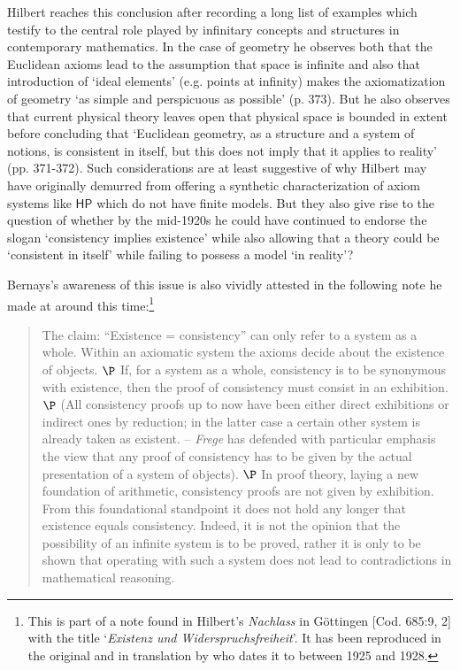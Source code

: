 \documentclass[11pt,fleqn,leqno]{article}
\begin{document}
Hilbert reaches this conclusion after recording a long list of examples which testify to the central role played by infinitary concepts and structures in contemporary mathematics.   In the case of geometry he observes both that the Euclidean axioms lead to the assumption that space is infinite and also that introduction of `ideal elements' (e.g. points at infinity) makes the axiomatization of geometry `as simple and perspicuous as possible' (p. 373).   But he also observes that current physical theory leaves open that physical space is bounded in extent before concluding that  `Euclidean geometry, as a structure and a system of notions, is consistent in itself, but this does not imply that it applies to reality' (pp. 371-372). Such considerations are at least suggestive of why Hilbert may have originally demurred from offering a synthetic characterization of axiom systems like $\mathsf{HP}$ which do not have finite models.    But they also give rise to the question of whether by the mid-1920s he could have continued to endorse the slogan `consistency implies existence' while also allowing that a theory could be `consistent in itself' while failing to possess a model `in reality'?

Bernays's awareness of this issue is also vividly attested in the following note he made at around this time:\footnote{This is part of a note found in Hilbert's \textsl{Nachlass} in G\"ottingen [Cod. 685:9, 2] with  the title `\textsl{Existenz und Widerspruchsfreiheit}'.   It has been reproduced in the original and in translation by \citet[p. 479]{Sieg2002a} who dates it to between 1925 and 1928.}
\begin{quote}
{\footnotesize  The claim: ``Existence = consistency'' can only refer to a system as a whole. Within an axiomatic system the axioms decide about the existence of objects. $\P$ If, for a system as a whole, consistency is to be synonymous with existence, then the proof of consistency must consist in an exhibition.  $\P$ (All consistency proofs up to now have been either direct exhibitions or indirect ones by reduction; in the latter case a certain other system is already taken as existent.  -- \textsl{Frege} has defended with particular emphasis the view that any proof of consistency has to be given by the actual presentation of a system of objects). $\P$ In proof theory, laying a new foundation of arithmetic, consistency proofs are not given by exhibition. From this foundational standpoint it does not hold any longer that existence equals consistency. Indeed, it is not the opinion that the possibility of an infinite system is to be proved, rather it is only to be shown that operating with such a system does not lead to contradictions in mathematical reasoning.}
\end{quote} 
\end{document}
